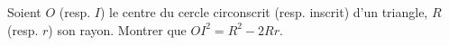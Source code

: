 Soient $O$ (resp. $I$) le centre du cercle circonscrit (resp. inscrit) d'un triangle, $R$ (resp. $r$) son rayon. Montrer que $OI^2 = R^2 - 2Rr$.
